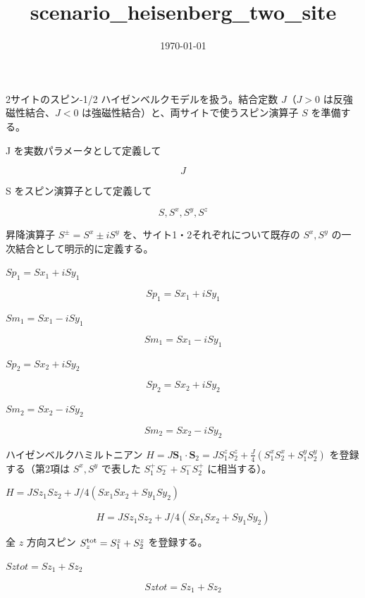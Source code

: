 \documentclass[dvipdfmx,a4paper,11pt]{jsarticle}
\title{scenario\_heisenberg\_two\_site}
\date{\today}
\begin{document}
\maketitle

2サイトのスピン-1/2 ハイゼンベルクモデルを扱う。結合定数 $J$（$J>0$ は反強磁性結合、$J<0$ は強磁性結合）と、両サイトで使うスピン演算子 $S$ を準備する。

J を実数パラメータとして定義して

\[
  J
\]

S をスピン演算子として定義して

\[
  S, S^{x}, S^{y}, S^{z}
\]

昇降演算子 $S^\pm=S^x\pm iS^y$ を、サイト1・2それぞれについて既存の $S^x,S^y$ の一次結合として明示的に定義する。

$Sp_1 = Sx_1 + i Sy_1$

\begin{equation}
  Sp_1 = Sx_1 + i Sy_1
  \label{eq:E1}
\end{equation}

$Sm_1 = Sx_1 - i Sy_1$

\begin{equation}
  Sm_1 = Sx_1 - i Sy_1
  \label{eq:E2}
\end{equation}

$Sp_2 = Sx_2 + i Sy_2$

\begin{equation}
  Sp_2 = Sx_2 + i Sy_2
  \label{eq:E3}
\end{equation}

$Sm_2 = Sx_2 - i Sy_2$

\begin{equation}
  Sm_2 = Sx_2 - i Sy_2
  \label{eq:E4}
\end{equation}

ハイゼンベルクハミルトニアン $H=J\mathbf S_1\cdot\mathbf S_2=JS_1^zS_2^z+\frac{J}{4}(S_1^xS_2^x+S_1^yS_2^y)$ を登録する（第2項は $S^x,S^y$ で表した $S_1^+S_2^-+S_1^-S_2^+$ に相当する）。

$H = J Sz_1 Sz_2 + J/4 (Sx_1 Sx_2 + Sy_1 Sy_2)$

\begin{equation}
  H = J Sz_1 Sz_2 + J/4 (Sx_1 Sx_2 + Sy_1 Sy_2)
  \label{eq:E5}
\end{equation}

全 $z$ 方向スピン $S_z^{\rm tot}=S_1^z+S_2^z$ を登録する。

$Sztot = Sz_1 + Sz_2$

\begin{equation}
  Sztot = Sz_1 + Sz_2
  \label{eq:E6}
\end{equation}
\end{document}
